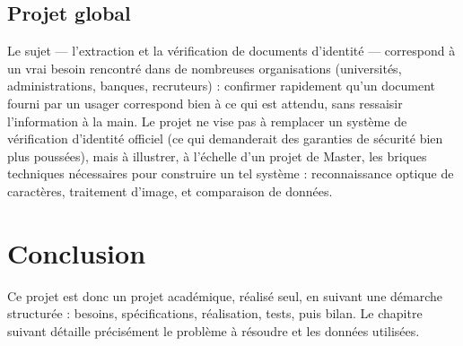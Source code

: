 \subsection{Projet global}

Le sujet --- l'extraction et la vérification de documents d'identité --- correspond à un vrai besoin rencontré dans de nombreuses organisations (universités, administrations, banques, recruteurs) : confirmer rapidement qu'un document fourni par un usager correspond bien à ce qui est attendu, sans ressaisir l'information à la main. Le projet ne vise pas à remplacer un système de vérification d'identité officiel (ce qui demanderait des garanties de sécurité bien plus poussées), mais à illustrer, à l'échelle d'un projet de Master, les briques techniques nécessaires pour construire un tel système : reconnaissance optique de caractères, traitement d'image, et comparaison de données.

\section{Conclusion}

Ce projet est donc un projet académique, réalisé seul, en suivant une démarche structurée : besoins, spécifications, réalisation, tests, puis bilan. Le chapitre suivant détaille précisément le problème à résoudre et les données utilisées.
